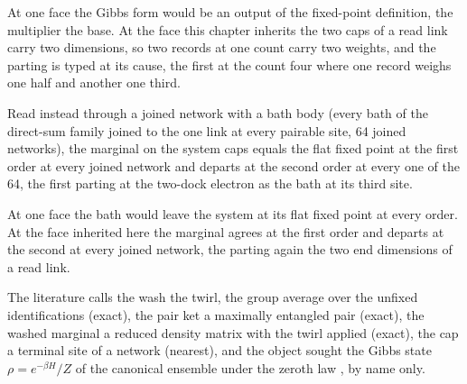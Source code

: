 At one face the Gibbs form would be an output of the fixed-point definition, the multiplier the base. At the face this chapter inherits the two caps of a read link carry two dimensions, so two records at one count carry two weights, and the parting is typed at its cause, the first at the count four where one record weighs one half and another one third.
\begin{chwall}\label{box:XI-2-thermal-state:2}
Read instead through a joined network with a bath body (every bath of the direct-sum family joined to the one link at every pairable site, 64 joined networks), the marginal on the system caps equals the flat fixed point at the first order at every joined network and departs at the second order at every one of the 64, the first parting at the two-dock electron as the bath at its third site.
\end{chwall}
At one face the bath would leave the system at its flat fixed point at every order. At the face inherited here the marginal agrees at the first order and departs at the second at every joined network, the parting again the two end dimensions of a read link.
\begin{chbridge}
The literature calls the wash the twirl, the group average over the unfixed identifications (exact), the pair ket a maximally entangled pair (exact), the washed marginal a reduced density matrix with the twirl applied (exact), the cap a terminal site of a network (nearest), and the object sought the Gibbs state $\rho = e^{-\beta H}/Z$ of the canonical ensemble \cite{Gibbs1902} under the zeroth law \cite{Callen1985}, by name only.
\end{chbridge}
